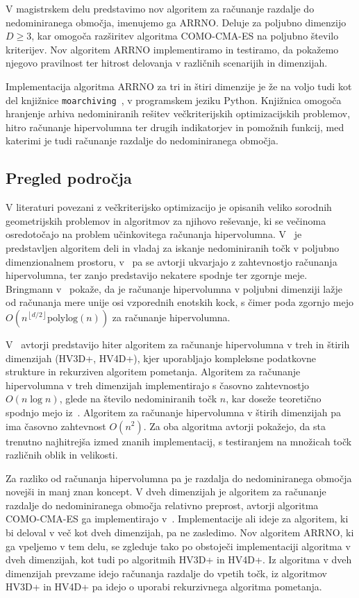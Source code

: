 V magistrskem delu predstavimo nov algoritem za računanje razdalje do nedominiranega območja, imenujemo ga ARRNO. Deluje za poljubno dimenzijo $D \geq 3$, kar omogoča razširitev algoritma COMO-CMA-ES na poljubno število kriterijev. Nov algoritem ARRNO implementiramo in testiramo, da pokažemo njegovo pravilnost ter hitrost delovanja v različnih scenarijih in dimenzijah. 

Implementacija algoritma ARRNO za tri in štiri dimenzije je že na voljo tudi kot del knjižnice  \texttt{moarchiving}~\cite{moarchiving}, v programskem jeziku Python. Knjižnica omogoča hranjenje arhiva nedominiranih rešitev večkriterijskih optimizacijskih problemov, hitro računanje hipervolumna ter drugih indikatorjev in pomožnih funkcij, med katerimi je tudi računanje razdalje do nedominiranega območja. 

\subsection{Pregled področja}
V literaturi povezani z večkriterijsko optimizacijo je opisanih veliko sorodnih geometrijskih problemov in algoritmov za njihovo reševanje, ki se večinoma osredotočajo na problem učinkovitega računanja hipervolumna. V~\cite{vector_maxima} je predstavljen algoritem deli in vladaj za iskanje nedominiranih točk v poljubno dimenzionalnem prostoru, v~\cite{hv_complexity} pa se avtorji ukvarjajo z zahtevnostjo računanja hipervolumna, ter zanjo predstavijo nekatere spodnje ter zgornje meje. Bringmann v~\cite{Bringmann} pokaže, da je računanje hipervolumna v poljubni dimenziji lažje od računanja mere unije osi vzporednih enotskih kock, s čimer poda zgornjo mejo $O(n^{\left \lfloor d/2 \right \rfloor} \text{polylog}(n))$ za računanje hipervolumna.

V~\cite{Guerreiro} avtorji predstavijo hiter algoritem za računanje hipervolumna v treh in štirih dimenzijah (HV3D+, HV4D+), kjer uporabljajo kompleksne podatkovne strukture in rekurziven algoritem pometanja. Algoritem za računanje hipervolumna v treh dimenzijah implementirajo s časovno zahtevnostjo $O(n \log n)$, glede na število nedominiranih točk $n$, kar doseže teoretično spodnjo mejo iz~\cite{hv_complexity}. Algoritem za računanje hipervolumna v štirih dimenzijah pa ima časovno zahtevnost $O(n^2)$. Za oba algoritma avtorji pokažejo, da sta trenutno najhitrejša izmed znanih implementacij, s testiranjem na množicah točk različnih oblik in velikosti. 

Za razliko od računanja hipervolumna pa je razdalja do nedominiranega območja novejši in manj znan koncept. V dveh dimenzijah je algoritem za računanje razdalje do nedominiranega območja relativno preprost, avtorji algoritma COMO-CMA-ES ga implementirajo v~\cite{moarchiving}. Implementacije ali ideje za algoritem, ki bi deloval v več kot dveh dimenzijah, pa ne zasledimo. Nov algoritem ARRNO, ki ga vpeljemo v tem delu, se zgleduje tako po obstoječi implementaciji algoritma v dveh dimenzijah, kot tudi po algoritmih HV3D+ in HV4D+. Iz algoritma v dveh dimenzijah prevzame idejo računanja razdalje do vpetih točk, iz algoritmov HV3D+ in HV4D+ pa idejo o uporabi rekurzivnega algoritma pometanja.

